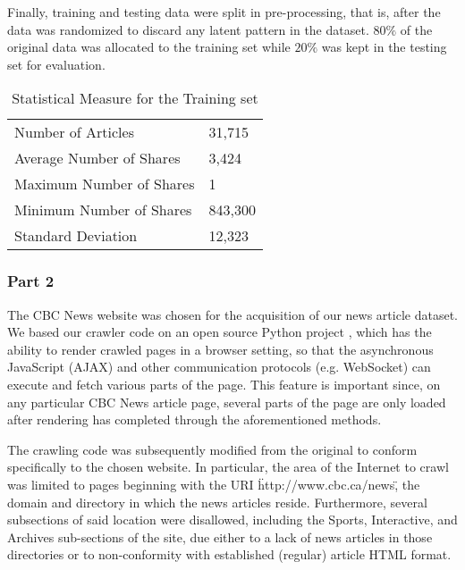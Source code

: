 \documentclass[conference,compsoc]{IEEEtran}
\begin{document}
Finally, training and testing data were split in pre-processing, that is, after the data was randomized to discard any latent pattern in the dataset. $80\%$ of the original data was allocated to the training set while $20\%$ was kept in the testing set for evaluation.

\begin{table}[]
	\centering
	\caption{Statistical Measure for the Training set}
	\label{table1}
	\begin{tabular}{@{}ll@{}}
		Number of Articles                      & 31,715                       \\
		Average Number of Shares                & 3,424                        \\
		Maximum Number of Shares                & 1                           \\
		Minimum Number of Shares                & 843,300                      \\
		Standard Deviation                      & 12,323
	\end{tabular}
\end{table}

\subsubsection{Part 2}

The CBC News website was chosen for the acquisition of our news article dataset. We based our crawler code on an open source Python project \cite{invernizzi-2013-crawler}, which has the ability to render crawled pages in a browser setting, so that the asynchronous JavaScript (AJAX) and other communication protocols (e.g. WebSocket) can execute and fetch various parts of the page. This feature is important since, on any particular CBC News article page, several parts of the page are only loaded after rendering has completed through the aforementioned methods.

The crawling code was subsequently modified from the original to conform specifically to the chosen website. In particular, the area of the Internet to crawl was limited to pages beginning with the URI \"http://www.cbc.ca/news\", the domain and directory in which the news articles reside. Furthermore, several subsections of said location were disallowed, including the Sports, Interactive, and Archives sub-sections of the site, due either to a lack of news articles in those directories or to non-conformity with established (regular) article HTML format.
\end{document}
